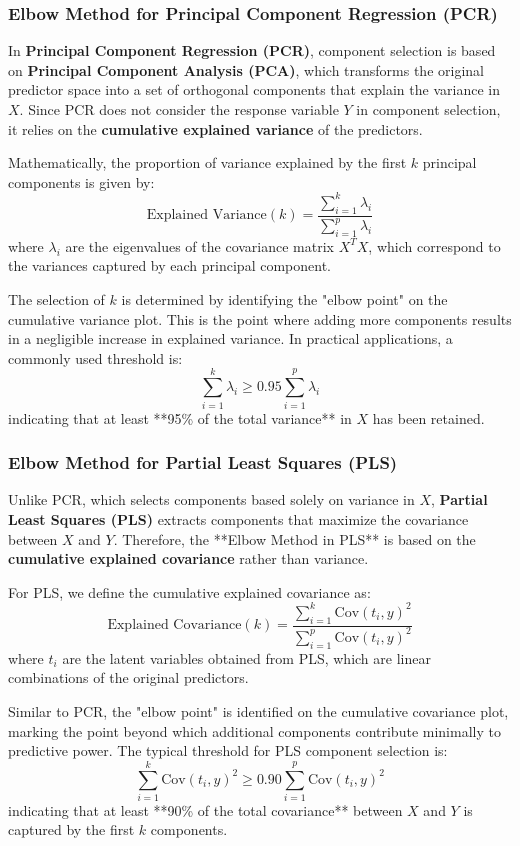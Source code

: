 \documentclass[11pt,twoside,a4paper]{article}
\begin{document}
\subsubsection{Elbow Method for Principal Component Regression (PCR)}
In \textbf{Principal Component Regression (PCR)}, component selection is based on \textbf{Principal Component Analysis (PCA)}, which transforms the original predictor space into a set of orthogonal components that explain the variance in \( X \). Since PCR does not consider the response variable \( Y \) in component selection, it relies on the \textbf{cumulative explained variance} of the predictors.

Mathematically, the proportion of variance explained by the first \( k \) principal components is given by:
\[
\text{Explained Variance}(k) = \frac{\sum_{i=1}^{k} \lambda_i}{\sum_{i=1}^{p} \lambda_i}
\]
where \( \lambda_i \) are the eigenvalues of the covariance matrix \( X^T X \), which correspond to the variances captured by each principal component.

The selection of \( k \) is determined by identifying the "elbow point" on the cumulative variance plot. This is the point where adding more components results in a negligible increase in explained variance. In practical applications, a commonly used threshold is:
\[
\sum_{i=1}^{k} \lambda_i \geq 0.95 \sum_{i=1}^{p} \lambda_i
\]
indicating that at least **95\% of the total variance** in \( X \) has been retained.

\subsubsection{Elbow Method for Partial Least Squares (PLS)}
Unlike PCR, which selects components based solely on variance in \( X \), \textbf{Partial Least Squares (PLS)} extracts components that maximize the covariance between \( X \) and \( Y \). Therefore, the **Elbow Method in PLS** is based on the \textbf{cumulative explained covariance} rather than variance.

For PLS, we define the cumulative explained covariance as:
\[
\text{Explained Covariance}(k) = \frac{\sum_{i=1}^{k} \text{Cov}(t_i, y)^2}{\sum_{i=1}^{p} \text{Cov}(t_i, y)^2}
\]
where \( t_i \) are the latent variables obtained from PLS, which are linear combinations of the original predictors.

Similar to PCR, the "elbow point" is identified on the cumulative covariance plot, marking the point beyond which additional components contribute minimally to predictive power. The typical threshold for PLS component selection is:
\[
\sum_{i=1}^{k} \text{Cov}(t_i, y)^2 \geq 0.90 \sum_{i=1}^{p} \text{Cov}(t_i, y)^2
\]
indicating that at least **90\% of the total covariance** between \( X \) and \( Y \) is captured by the first \( k \) components.
\end{document}
